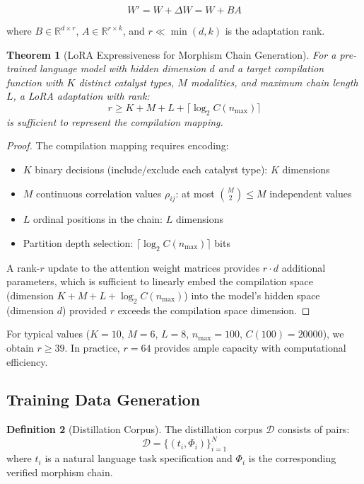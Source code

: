 \documentclass[11pt,twocolumn,a4paper]{article}
\newtheorem{theorem}{Theorem}[section]
\theoremstyle{definition}
\newtheorem{definition}[theorem]{Definition}
\theoremstyle{remark}
\newcommand{\R}{\mathbb{R}}
\newcommand{\morphism}{\Phi}
\newcommand{\dataset}{\mathcal{D}}
\begin{document}
\begin{equation}
W' = W + \Delta W = W + BA
\end{equation}

where $B \in \R^{d \times r}$, $A \in \R^{r \times k}$, and $r \ll \min(d, k)$ is the adaptation rank.

\begin{theorem}[LoRA Expressiveness for Morphism Chain Generation]
\label{thm:lora}
For a pre-trained language model with hidden dimension $d$ and a target compilation function with $K$ distinct catalyst types, $M$ modalities, and maximum chain length $L$, a LoRA adaptation with rank:
\begin{equation}
r \geq K + M + L + \lceil \log_2 C(n_{\max}) \rceil
\end{equation}
is sufficient to represent the compilation mapping.
\end{theorem}

\begin{proof}
The compilation mapping requires encoding:
\begin{itemize}
    \item $K$ binary decisions (include/exclude each catalyst type): $K$ dimensions
    \item $M$ continuous correlation values $\rho_{ij}$: at most $\binom{M}{2} \leq M$ independent values
    \item $L$ ordinal positions in the chain: $L$ dimensions
    \item Partition depth selection: $\lceil \log_2 C(n_{\max}) \rceil$ bits
\end{itemize}

A rank-$r$ update to the attention weight matrices provides $r \cdot d$ additional parameters, which is sufficient to linearly embed the compilation space (dimension $K + M + L + \log_2 C(n_{\max})$) into the model's hidden space (dimension $d$) provided $r$ exceeds the compilation space dimension.
\end{proof}

For typical values ($K = 10$, $M = 6$, $L = 8$, $n_{\max} = 100$, $C(100) = 20000$), we obtain $r \geq 39$. In practice, $r = 64$ provides ample capacity with computational efficiency.

\subsection{Training Data Generation}

\begin{definition}[Distillation Corpus]
\label{def:corpus}
The distillation corpus $\dataset$ consists of pairs:
\begin{equation}
\dataset = \{(t_i, \morphism_i)\}_{i=1}^{N}
\end{equation}
where $t_i$ is a natural language task specification and $\morphism_i$ is the corresponding verified morphism chain.
\end{definition}
\end{document}
